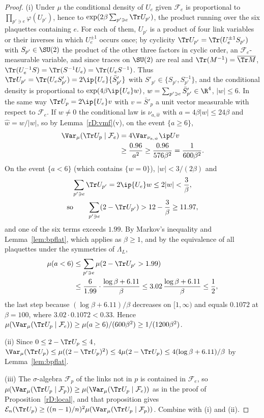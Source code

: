 \begin{proof}
(i) Under $\mu$ the conditional density of $U_e$ given $\mathcal F_e$ is
proportional to $\prod_{p'\ni e}\varphi(U_{p'})$, hence to $\exp(2\beta
\sum_{p'\ni e}\Tr U_{p'})$, the product running over the six plaquettes
containing $e$. For each of them, $U_{p'}$ is a product of four link
variables or their inverses in which $U_e^{\pm1}$ occurs once; by
cyclicity $\Tr U_{p'}=\Tr(U_e^{\pm1}S_{p'})$ with $S_{p'}\in\SU(2)$ the
product of the other three factors in cyclic order, an $\mathcal
F_e$-measurable variable, and since traces on $\SU(2)$ are real and
$\Tr(M^{-1})=\overline{\Tr M}$, $\Tr(U_e^{-1}S)=\Tr(S^{-1}U_e)=\Tr(U_eS^{-1}
)$. Thus $\Tr U_{p'}=\Tr(U_eS'_{p'})=2\ip{U_e}{\bar S'_{p'}}$ with $S'_{p'}
\in\{S_{p'},S_{p'}^{-1}\}$, and the conditional density is proportional to
$\exp(4\beta\ip{U_e}w)$, $w=\sum_{p'\ni e}\bar S'_{p'}\in\R^4$, $\lvert w
\rvert\le6$. In the same way $\Tr U_p=2\ip{U_e}v$ with $v=\bar S'_p$ a unit
vector measurable with respect to $\mathcal F_e$. If $w\ne0$ the conditional
law is $\nu_{a,\hat w}$ with $a=4\beta\lvert w\rvert\le24\beta$ and $\hat w=
w/\lvert w\rvert$, so by Lemma~\ref{rD:vmf}(v), on the event $\{a\ge6\}$,
\[
\begin{split}
\Var_\mu(\Tr U_p\mid\mathcal F_e)&=4\Var_{\nu_{a,\hat w}}\ip Uv\\
&\ge\frac{0.96}{a^2}\ge\frac{0.96}{576\beta^2}=\frac1{600\beta^2}.
\end{split}
\]
On the event $\{a<6\}$ (which contains $\{w=0\}$), $\lvert w\rvert<3/(2
\beta)$ and
\begin{gather*}
\sum_{p'\ni e}\Tr U_{p'}=2\ip{U_e}w\le2\lvert w\rvert<\frac3\beta,\\
\text{so}\qquad\sum_{p'\ni e}(2-\Tr U_{p'})>12-\frac3\beta\ge11.97,
\end{gather*}
and one of the six terms exceeds $1.99$. By Markov's inequality and
Lemma~\ref{lem:bpflat}, which applies as $\beta\ge1$, and by the
equivalence of all plaquettes under the symmetries of $\Lambda_L$,
\[
\begin{split}
\mu(a<6)&\le\sum_{p'\ni e}\mu(2-\Tr U_{p'}>1.99)\\
&\le\frac6{1.99}\cdot\frac{\log\beta+6.11}\beta\le3.02\,\frac{\log\beta+6.11}
\beta\le\frac12,
\end{split}
\]
the last step because $(\log\beta+6.11)/\beta$ decreases on $[1,\infty)$
and equals $0.1072$ at $\beta=100$, where $3.02\cdot0.1072<0.33$. Hence
$\mu(\Var_\mu(\Tr U_p\mid\mathcal F_e))\ge\mu(a\ge6)/(600\beta^2)\ge1/(1200
\beta^2)$.

(ii) Since $0\le2-\Tr U_p\le4$, $\Var_\mu(\Tr U_p)\le\mu((2-\Tr U_p)^2)\le
4\mu(2-\Tr U_p)\le4(\log\beta+6.11)/\beta$ by Lemma~\ref{lem:bpflat}.

(iii) The $\sigma$-algebra $\mathcal F_p$ of the links not in $p$ is
contained in $\mathcal F_e$, so $\mu(\Var_\mu(\Tr U_p\mid\mathcal F_p))\ge
\mu(\Var_\mu(\Tr U_p\mid\mathcal F_e))$ as in the proof of
Proposition~\ref{rD:local}, and that proposition gives $\mathcal E_n(\Tr
U_p)\ge((n-1)/n)^2\mu(\Var_\mu(\Tr U_p\mid\mathcal F_p))$. Combine with (i)
and (ii).
\end{proof}

